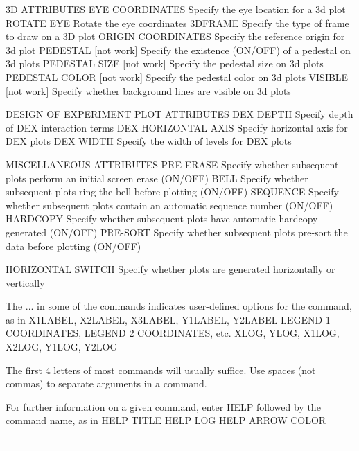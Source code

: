 3D ATTRIBUTES
   EYE COORDINATES            Specify the eye location for a 3d plot
   ROTATE EYE                 Rotate the eye coordinates
   3DFRAME                    Specify the type of frame to draw on a
                              3D plot
   ORIGIN COORDINATES         Specify the reference origin for 3d plot
   PEDESTAL        [not work] Specify the existence (ON/OFF) of a
                              pedestal on 3d plots
   PEDESTAL SIZE   [not work] Specify the pedestal size on 3d plots
   PEDESTAL COLOR  [not work] Specify the pedestal color on 3d plots
   VISIBLE         [not work] Specify whether background lines are
                              visible on 3d plots
 
DESIGN OF EXPERIMENT PLOT ATTRIBUTES
   DEX DEPTH                  Specify depth of DEX interaction terms
   DEX HORIZONTAL AXIS        Specify horizontal axis for DEX plots
   DEX WIDTH                  Specify the width of levels for DEX plots
 
MISCELLANEOUS ATTRIBUTES
   PRE-ERASE                  Specify whether subsequent plots perform
                              an initial screen erase (ON/OFF)
   BELL                       Specify whether subsequent plots ring the
                              bell before plotting (ON/OFF)
   SEQUENCE                   Specify whether subsequent plots contain
                              an automatic sequence number (ON/OFF)
   HARDCOPY                   Specify whether subsequent plots have
                              automatic hardcopy generated (ON/OFF)
   PRE-SORT                   Specify whether subsequent plots pre-sort
                              the data before plotting (ON/OFF)
 
   HORIZONTAL SWITCH          Specify whether plots are generated
                              horizontally or vertically
 
 
The ... in some of the commands indicates user-defined options for
the command, as in
   X1LABEL, X2LABEL, X3LABEL, Y1LABEL, Y2LABEL
   LEGEND 1 COORDINATES, LEGEND 2 COORDINATES, etc.
   XLOG, YLOG, X1LOG, X2LOG, Y1LOG, Y2LOG
 
The first 4 letters of most commands will usually suffice.  Use spaces
(not commas) to separate arguments in a command.
 
For further information on a given command, enter HELP   followed by
the command name, as in
   HELP TITLE
   HELP LOG
   HELP ARROW COLOR
 
----------------------------------------------------------
 
